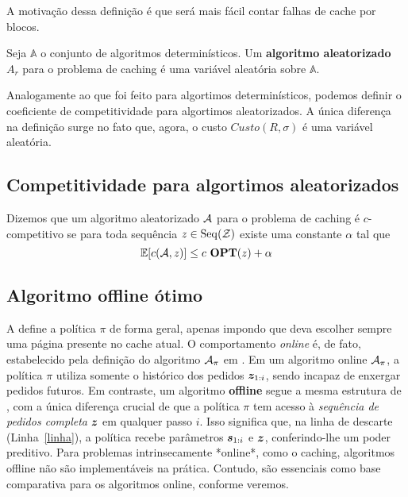 A motivação dessa definição é que será mais fácil contar falhas de cache por blocos.

\begin{definition}
  Seja \(\mathbb{A}\) o conjunto de algoritmos determinísticos. Um \textbf{algoritmo aleatorizado} \(A_r\) para o problema de caching é uma variável aleatória sobre \(\mathbb{A}\). 
\end{definition}

Analogamente ao que foi feito para algortimos determinísticos, podemos definir o coeficiente de competitividade para algortimos aleatorizados. A única diferença na definição surge no fato que, agora, o custo \(Custo(R, \sigma)\) é uma variável aleatória.

\subsection{Competitividade para algortimos aleatorizados}

\begin{definition}
  Dizemos que um algoritmo aleatorizado \(\mathcal{A}\) para o problema de caching é \(c\)-competitivo se para toda sequência \(z \in \operatorname{Seq}(\mathcal{Z})\) existe uma constante \(\alpha\) tal que
  \begin{equation}
    \mathbb{E}[c(\mathcal{A}, z)] \le c \ \textbf{OPT}(z) + \alpha
  \end{equation}
  
\end{definition}




\subsection{Algoritmo offline ótimo}

A  define a política \(\pi\) de forma geral, apenas impondo que deva escolher sempre uma página presente no cache atual. O comportamento \emph{online} é, de fato, estabelecido pela definição do algoritmo \(\mathcal{A}_\pi\) em . Em um algoritmo online \(\mathcal{A}_\pi\), a política \(\pi\) utiliza somente o histórico dos pedidos \(\bm{z}_{1:i}\), sendo incapaz de enxergar pedidos futuros. Em contraste, um algoritmo \textbf{offline} segue a mesma estrutura de , com a única diferença crucial de que a política \(\pi\) tem acesso à \emph{sequência de pedidos completa} \(\bm{z}\) em qualquer passo \(i\). Isso significa que, na linha de descarte (Linha~\ref{linha}), a política recebe parâmetros \(\bm{s}_{1:i}\) e \(\bm{z}\), conferindo-lhe um poder preditivo. Para problemas intrinsecamente *online*, como o caching, algoritmos offline não são implementáveis na prática. Contudo, são essenciais como base comparativa para os algoritmos online, conforme veremos.

